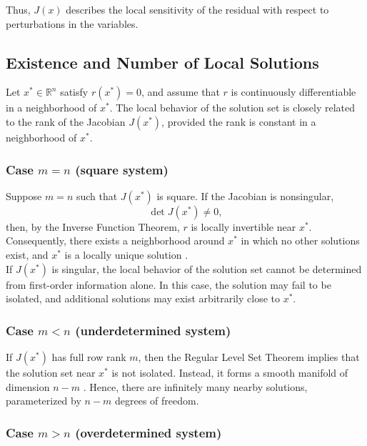 Thus, \(J(x)\) describes the local sensitivity of the residual with respect to perturbations in the variables.

\subsection{Existence and Number of Local Solutions}
\label{sec:sol_existence}

Let $x^\ast \in \mathbb{R}^n$ satisfy $r(x^\ast)=0$, and assume that $r$ is continuously differentiable in a neighborhood of $x^\ast$. The local behavior of the solution set is closely related to the rank of the Jacobian $J(x^\ast)$, provided the rank is constant in a neighborhood of $x^\ast$.

\subsubsection*{Case $m = n$ (square system)}

Suppose $m=n$ such that $J(x^\ast)$ is square. If the Jacobian is nonsingular,
\[
\det J(x^\ast) \neq 0,
\]
then, by the Inverse Function Theorem, $r$ is locally invertible near $x^\ast$. Consequently, there exists a neighborhood around $x^\ast$ in which no other solutions exist, and $x^\ast$ is a locally unique solution \cite[pp.~657-660]{lee2013smooth}.\\

If $J(x^\ast)$ is singular, the local behavior of the solution set cannot be determined from first-order information alone. In this case, the solution may fail to be isolated, and additional solutions may exist arbitrarily close to $x^\ast$.

\subsubsection*{Case $m < n$ (underdetermined system)}


If $J(x^\ast)$ has full row rank $m$, then the Regular Level Set Theorem implies that the solution set near $x^\ast$ is not isolated. Instead, it forms a smooth manifold of dimension $n - m$ \cite[pp.~105-106]{lee2013smooth}. Hence, there are infinitely many nearby solutions, parameterized
by $n - m$ degrees of freedom.

\subsubsection*{Case $m > n$ (overdetermined system)}

